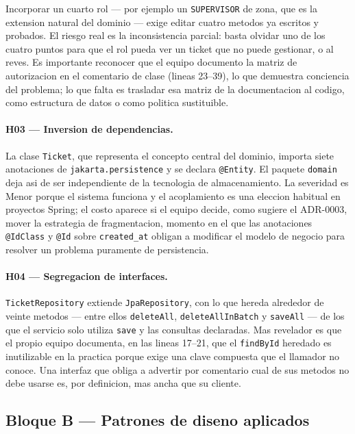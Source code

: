\documentclass[10pt,a4paper]{article}
\begin{document}
Incorporar un cuarto rol --- por ejemplo un \texttt{SUPERVISOR} de zona, que es la extension
natural del dominio --- exige editar cuatro metodos ya escritos y probados. El riesgo real
es la inconsistencia parcial: basta olvidar uno de los cuatro puntos para que el rol pueda
ver un ticket que no puede gestionar, o al reves. Es importante reconocer que el equipo
documento la matriz de autorizacion en el comentario de clase (lineas 23--39), lo que
demuestra conciencia del problema; lo que falta es trasladar esa matriz de la documentacion
al codigo, como estructura de datos o como politica sustituible.

\paragraph{H03 --- Inversion de dependencias.}
La clase \texttt{Ticket}, que representa el concepto central del dominio, importa siete
anotaciones de \texttt{jakarta.persistence} y se declara \texttt{@Entity}. El paquete
\texttt{domain} deja asi de ser independiente de la tecnologia de almacenamiento. La
severidad es Menor porque el sistema funciona y el acoplamiento es una eleccion habitual en
proyectos Spring; el costo aparece si el equipo decide, como sugiere el ADR-0003, mover la
estrategia de fragmentacion, momento en el que las anotaciones \texttt{@IdClass} y
\texttt{@Id} sobre \texttt{created\_at} obligan a modificar el modelo de negocio para
resolver un problema puramente de persistencia.

\paragraph{H04 --- Segregacion de interfaces.}
\texttt{TicketRepository} extiende \texttt{JpaRepository}, con lo que hereda alrededor de
veinte metodos --- entre ellos \texttt{deleteAll}, \texttt{deleteAllInBatch} y
\texttt{saveAll} --- de los que el servicio solo utiliza \texttt{save} y las consultas
declaradas. Mas revelador es que el propio equipo documenta, en las lineas 17--21, que el
\texttt{findById} heredado es inutilizable en la practica porque exige una clave compuesta
que el llamador no conoce. Una interfaz que obliga a advertir por comentario cual de sus
metodos no debe usarse es, por definicion, mas ancha que su cliente.

\subsection{Bloque B --- Patrones de diseno aplicados}
\end{document}

